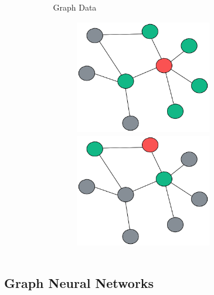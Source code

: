 \documentclass[aspectratio=169]{beamer}
\begin{document}
\begin{frame}[t]
\begin{columns}
\begin{column}{.48\textwidth}
\begin{minipage}[c][.9\textheight][c]{.98\textwidth}
\begin{center}
\begin{figure}
\begin{overprint}
                        \end{overprint}
                    \end{figure}
                \end{center}
            \end{minipage}
        \end{column}%
        \begin{column}{.48\textwidth}
            \begin{minipage}[c][.9\textheight][c]{.98\textwidth}
                \begin{center}
                    \vskip-0.225cm
                    Graph Data
                    \vskip0.5cm
                    \begin{figure}
                        \begin{overprint}
                            \centering \includegraphics[width=6cm, height=5cm]{img/graph_conv_1.png}
                            \centering \includegraphics[width=6cm, height=5cm]{img/graph_conv_2.png}
                        \end{overprint}
                    \end{figure}
                \end{center}
            \end{minipage}
        \end{column}%
    \end{columns}
\end{frame}


\subsection{Graph Neural Networks}
\end{document}
